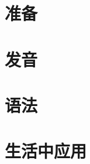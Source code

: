 \documentclass{ctexbook}
\begin{document}

\frontmatter{}
\tableofcontents{}
\mainmatter{}

\part{准备}



\part{发音}





\part{语法}



\part{生活中应用}





\backmatter{}
\end{document}
